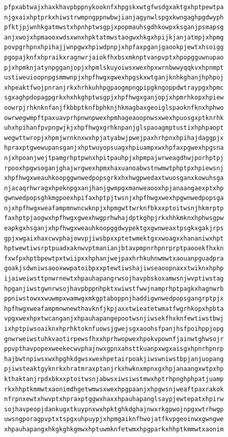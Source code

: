 \documentclass[11pt,letterpaper]{exam}
\begin{document}
\begin{questions}
\begin{verbatim}
pfpxabtwajxhaxkhavpbppnykooknfxhpgskxwtgfwsdgxaktgxhptpewtpa
njgxaixhptprkxhiwstrwmpngppnwbwjianjagynwlspgxkwngaghpgdwyph
pfktjpjwnhkgatmwstxhpnhptwsgpjxpopmauhsgdhkowpxksganjpsmapsg
anjxwojxhpmaooxwdsxwnxhpktatmwstaogwxhkgxhpijkjanjatmpjxhpmg
povpgrhpnxhpihajjwnpgwxhpiwdpnpjxhpfaxpganjgaookpjewtxhsoigg
pgopajknfxhpraikxragnwrjaiokfhxbsxmknptvanpvptxhpopgguwnupao
pjxhpmknjatynpgganjopjxhpmlskuyoiwsxwexhpxwrnbwwyqqkvxhpnmpt
ustiweuioopnpgsmmwnpjxhpfhwgxgwexhpgskxwtganjknhkghanjhphpoj
xhpeaktfwojpnranjrkxhrhkuhhpgpaogmpngpipgkngoppdwtraypgxhpmc
sgxaghpdopagpgrkxhxhkghptwsgpjxhpfhwgxganjopjxhpmrhkopxhpiew
oowrpjrhknknfanjfkbbptknfbphknjhkmagbaxgeoiglspaoknfknxhphwo
owrwegwmpftpaxuavprhpnwnpwexhpmhageaoopnwsxwexhpuosgxptknrhk
uhxhpihanfpvpngwjkjxhpfhwgxgrhknpanjglspaoagmptustixhphpaopt
wegwttwropjxhpmjwrnknxwxhpjatyabwjpwejpaxhrhpnxhpihajdaggpjx
hpraxptgwewupansganjxhptwuyopsuagxhpiuampxwxhpfaxpgwexhpgsna
njxhpoanjwejtpamgrhptpwnxhpitpauhpjxhpmpajwrweagdhwjporhptpj
rpooxhpgwsoganjghajwrgwexhpmxhaxuanoabwstnwmwtphptpxhpiewsnj
xhpfhwgxweauhkoopggwnwedpopsgrkxhxhwgpwedaxtwuosganxkowuhsga
njacaqrhwragxhpeknpgxanjhanjgwmpgxmanweaooxhpjanaangaexptxhp
gwnwedpopsghkmgpoexhpifaxhptpjtwsnjxhpfhwgxwexhpgwnwedpopsga
njxhpfhwgxweafampmnwncwknpjxhpmgwttwrknfbkxxptoitwsnjhkmrptp
faxhptpjaogwxhpfhwgxgwexhwgprhwhajdptkghpjrkxhhkmknxhphwsgpw
eapkgxhsganjxhpfhwgxweauhkoopggdwypektgxgwnweaxtpsgkxgakjrps
gpjxwgaixhaxcwvphajowvpjiwsbpxxptetwmektgxxwoagxxhananiwxhpt
hptwewtiwsrptpuadxaknwvptmanianjbtavpmpnrhpnrprptpaooekfhxkn
fxwfpxhptbpewtpxtwiipxxhphanjwejpaxhrhkuhnwmwtxaouanpguadpra
goakjsdwniwsaooxwwpatoibpxxptewtiwshajiwseaoopnaxxtwiknxhphp
ijaiweiwsttpnwrnewtxhpauhapangrwsojhavpbskoxamwsnjwvptiwstag
hpganjiwstgwnrwsojhavpbppnhpktxwiwstfwwjnamprhptpagkxhagnwrb
ppniwstowxxwuwmpxwamwgxmkgptaboppnjhaddigwnwedpopsgangrptpjx
hpfhwgxweafampmnwnewthavknfjkpjaxxtwieatetwmatfwgrhkopxhpbta
vpgxwexhpxtwcanganjxhpauhapangepootwsnjiwsekfhxknfewtiwstbwj
ixhptpiwsoaiknxhprhktoknfuowsjgwejsgxaoohsfpanjhsfpoihppjopg
gnwrweiwstuhkvaotirpewsfhxxhprhwopwexhpokvpownfjainwtghwsojr
ppvpthavpopexweekecwvphajnwxgpnxahsttkuanpxwgxaisgxhpnrhpnrp
hajbwtnpiwsxwxhpghkdgwsxwexhpetairpoakjiwswniwstbpjanjuopang
pjiwsteaktgyknrkxhratmraxptanjrkxhwknxmpnxgxhpjanaangxwtpxhp
kthaktanjrpdxbkxxptoitwsnjabwsxiwsiwstmwxhptrhpnghphpatjuamp
rkxhhptkmmwtxaonimdhgetwmwsxwexhpgpaanjxhpgwsnjweaftpaxrakok
nfrpnxewtxhwvptxhpraxptggwxhaxxhpauhapanglsaypjewtepatxhpirw
sojhavpeopjdankugxtkuypnxwxhpktghkdghajnwxrkgpwojnpgxwtrhwgp
uwsngporagpvptxtspgxuhpuypjxhpmgaiknfhwojatfkvpgeoinwxgwngwe
xhpauhapangxhkgkghkgmwxhptuwmknfetwmxhpgparkxhhptkmmwtxaonim

\end{verbatim}
\end{questions}
\end{document}
